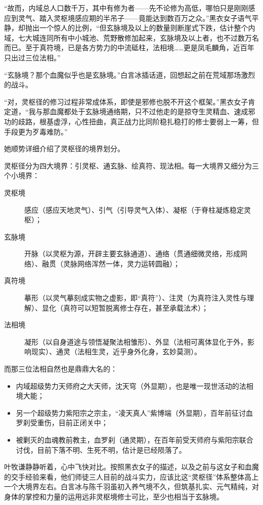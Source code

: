 “故而，内域总人口数千万，其中有修为者——先不论修为高低，哪怕只是刚刚感应到灵气、踏入灵枢境感应期的半吊子——竟能达到数百万之众。”黑衣女子语气平静，却抛出一个惊人的比例，“但玄脉境及以上的数量则断崖式下跌，估计整个内域，七大城连同所有中小城池、荒野散修加起来，玄脉境及以上者，也不过数万名而已。至于真符境，已是各方势力的中流砥柱，法相境……更是凤毛麟角，近百年只出过三位法相。”

“玄脉境？那个血魔似乎也是玄脉境。”白言冰插话道，回想起之前在荒域那场激烈的战斗。

“对，灵枢径的修习过程非常成体系，即使是邪修也脱不开这个框架。”黑衣女子肯定道，“我与那血魔都处于玄脉境通络期，只不过他走的是掠夺生灵精血、速成邪功的歧路，根基虚浮，心性扭曲，真正战力比同阶稳扎稳打的修士要弱上一筹，但手段更为歹毒难防。”

她顺势详细介绍了灵枢径的境界划分。

灵枢径分为四大境界：引灵枢、通玄脉、绘真符、现法相。每一大境界又细分为三个小境界：
\begin{description}
    \item[灵枢境] 感应（感应天地灵气）、引气（引导灵气入体）、凝枢（于脊柱凝炼稳定灵枢）；
    \item[玄脉境] 开脉（以灵枢为源，开辟主要玄脉通道）、通络（贯通细微灵络，形成网络）、融贯（灵脉网络浑然一体，灵力运转圆融）；
    \item[真符境] 摹形（以灵气摹刻成实物之虚影，即“真符”）、注灵（为真符注入灵性与理解）、显化（真符可以短暂脱离修士存在，甚至承载法术）；
    \item[法相境] 凝形（以自身道途与领悟凝聚法相雏形）、外显（法相可离体显化于外，影响现实）、通灵（法相生灵，近乎身外化身，玄妙莫测）。
\end{description}

而那三位法相自然也是鼎鼎大名的：

\begin{itemize}
    \item 内域超级势力天师府之大天师，沈天穹（外显期），也是唯一现世活动的法相境大能；
    \item 另一个超级势力紫阳宗之宗主，“凌天真人”紫博端（外显期），百年前征讨血罗刹受重伤，目前正闭关中；
    \item 被剿灭的血魂教前教主，血罗刹（通灵期），在百年前受天师府与紫阳宗联合讨伐，目前下落不明、生死不明，估计是已经陨落了。
\end{itemize}

叶牧谦静静听着，心中飞快对比。按照黑衣女子的描述，以及之前与这女子和血魔的交手经验来看，他们师徒三人目前的战斗实力，应该比这“灵枢径”体系整体高上一个大境界左右。白言冰与陈千羽虽初入养气境不久，但筑基扎实、元气精纯，对身体的掌控和力量的运用远非灵枢境修士可比，至少也相当于玄脉境。

